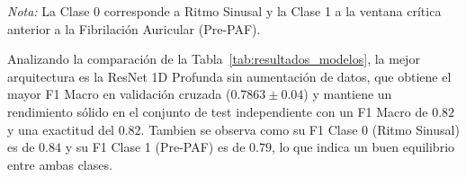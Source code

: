 \begin{table}[htbp]
  \centering
  \caption{Resultados del rendimiento de las mejores variantes de cada arquitectura (seleccionadas según su F1 en validación) en validación y test}
  \label{tab:resultados_modelos}
  \vskip 5pt
  \small
  \textit{Nota:} La Clase 0 corresponde a Ritmo Sinusal y la Clase 1 a la ventana crítica anterior a la Fibrilación Auricular (Pre-PAF).
\end{table}

Analizando la comparación de la Tabla~\ref{tab:resultados_modelos}, la mejor arquitectura es la ResNet 1D Profunda
sin aumentación de datos, que obtiene el mayor F1 Macro en validación cruzada ($0.7863 \pm 0.04$)
y mantiene un rendimiento sólido en el conjunto de test independiente con un F1 Macro de $0.82$ y una exactitud del $0.82$.
Tambien se observa como su F1 Clase 0 (Ritmo Sinusal) es de $0.84$ y su F1 Clase 1 (Pre-PAF) es de $0.79$,
lo que indica un buen equilibrio entre ambas clases.

